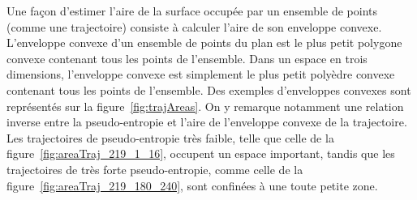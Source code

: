 	Une façon d'estimer l'aire de la surface occupée par un ensemble de points (comme une trajectoire) consiste à calculer l'aire de son enveloppe convexe. L'enveloppe convexe d'un ensemble de points du plan est le plus petit polygone convexe contenant tous les points de l'ensemble. Dans un espace en trois dimensions, l'enveloppe convexe est simplement le plus petit polyèdre convexe contenant tous les points de l'ensemble. Des exemples d'enveloppes convexes sont représentés sur la figure~\ref{fig:trajAreas}. On y remarque notamment une relation inverse entre la pseudo-entropie et l'aire de l'enveloppe convexe de la trajectoire. Les trajectoires de pseudo-entropie très faible, telle que celle de la figure~\ref{fig:areaTraj_219_1_16}, occupent un espace important, tandis que les trajectoires de très forte pseudo-entropie, comme celle de la figure~\ref{fig:areaTraj_219_180_240}, sont confinées à une toute petite zone.
	
